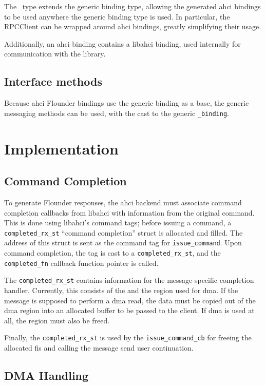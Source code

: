 The \flahcib\ type extends the generic binding type, allowing the generated
\acs{ahci} bindings to be used anywhere the generic binding type is used. In
particular, the RPCClient can be wrapped around \acs{ahci} bindings, greatly
simplifying their usage.

Additionally, an \acs{ahci} binding contains a libahci binding, used internally
for communication with the library.

\subsection{Interface methods}

Because \acs{ahci} Flounder bindings use the generic binding as a base, the
generic messaging methods can be used, with the \flahcib cast to the generic
\flifname\lstinline+_binding+.

\section{Implementation}

\subsection{Command Completion}

To generate Flounder responses, the \ac{ahci} backend must associate command
completion callbacks from libahci with information from the original command.
This is done using libahci's command tags; before issuing a command, a
\lstinline+completed_rx_st+ ``command completion'' struct is allocated and
filled. The address of this struct is sent as the command tag for
\lstinline+issue_command+. Upon command completion, the tag is cast to a
\lstinline+completed_rx_st+, and the \lstinline+completed_fn+ callback function
pointer is called.

The \lstinline+completed_rx_st+ contains information for the message-specific
completion handler. Currently, this consists of the \flahcib and the region
used for \acs{dma}. If the message is supposed to perform a \acs{dma} read, the
data must be copied out of the \acs{dma} region into an allocated buffer to be
passed to the client. If \acs{dma} is used at all, the region must also be
freed.

Finally, the \lstinline+completed_rx_st+ is used by the
\lstinline+issue_command_cb+ for freeing the allocated \ac{fis} and calling the
message send user continuation.

\subsection{DMA Handling}


